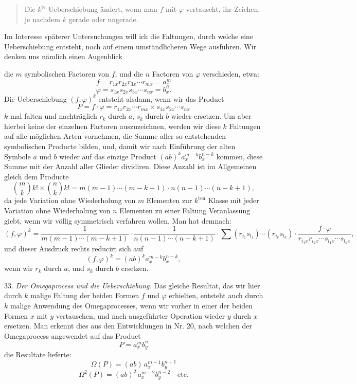 \documentclass[11pt]{article}
\providecommand{\weberpage}[1]{}
\let\Omega\varOmega
\begin{document}
\begin{quote}
\glqq Die $k^{\text{te}}$ Ueberschiebung ändert, wenn man $f$ mit $\varphi$
vertauscht, ihr Zeichen, je nachdem $k$ gerade oder ungerade.\grqq{}
\end{quote}

Im Interesse späterer Untersuchungen will ich die Faltungen, durch welche
eine Ueberschiebung entsteht, noch auf einem umständlicheren Wege
ausführen. Wir denken uns nämlich einen Augenblick


\weberpage{34}

die $m$ symbolischen Factoren von $f$, und die $n$ Factoren von $\varphi$
verschieden, etwa:
\[
f = r_{1x} r_{2x} r_{3x} \cdots r_{mx} = a_x^m
\]
\[
\varphi = s_{1x} s_{2x} s_{3x} \cdots s_{nx} = b_x^n.
\]
Die Ueberschiebung $(f, \varphi)^k$ entsteht alsdann, wenn wir das Product
\[
P = f \cdot \varphi = r_{1x} r_{2x} \cdots r_{mx} \times s_{1x} s_{2x} \cdots s_{nx}
\]
$k$ mal falten und nachträglich $r_k$ durch $a$, $s_k$ durch $b$ wieder
ersetzen. Um aber hierbei keine der einzelnen Factoren auszuzeichnen, werden
wir diese $k$ Faltungen auf alle möglichen Arten vornehmen, die Summe aller
so entstehenden symbolischen Producte bilden, und, damit wir nach
Einführung der alten Symbole $a$ und $b$ wieder auf das einzige Product
$(ab)^k a_x^{m-k} b_x^{n-k}$ kommen, diese Summe mit der Anzahl aller
Glieder dividiren. Diese Anzahl ist im Allgemeinen gleich dem Producte
\[
\binom{m}{k} k! \times \binom{n}{k} k! = m(m-1) \cdots (m-k+1) \cdot n(n-1) \cdots (n-k+1),
\]
da jede Variation ohne Wiederholung von $m$ Elementen zur $k^{\text{ten}}$
Klasse mit jeder Variation ohne Wiederholung von $n$ Elementen zu einer
Faltung Veranlassung giebt, wenn wir völlig symmetrisch verfahren wollen.
Man hat demnach:
\[
(f, \varphi)^k = \frac{1}{m(m-1) \cdots (m-k+1)} \cdot \frac{1}{n(n-1) \cdots (n-k+1)}
\cdot \sum (r_{i_1} s_{l_1}) \cdots (r_{i_k} s_{l_k}) \cdot \frac{f \cdot \varphi}{r_{i_1 x} r_{i_2 x} \cdots s_{l_1 x} \cdots s_{l_k x}},
\]
und dieser Ausdruck rechts reducirt sich auf
\[
(f, \varphi)^k = (ab)^k a_x^{m-k} b_x^{n-k},
\]
wenn wir $r_k$ durch $a$, und $s_k$ durch $b$ ersetzen.

33. \textit{Der Omegaprocess und die Ueberschiebung.} Das gleiche
Resultat, das wir hier durch $k$ malige Faltung der beiden Formen $f$ und
$\varphi$ erhielten, entsteht auch durch $k$ malige Anwendung des
Omegaprocesses, wenn wir vorher in einer der beiden Formen $x$ mit $y$
vertauschen, und nach ausgeführter Operation wieder $y$ durch $x$
ersetzen. Man erkennt dies aus den Entwicklungen in Nr. 20, nach welchen
der Omegaprocess angewendet auf das Product
\[
P = a_x^m b_y^n
\]
die Resultate lieferte:
\[
\Omega(P) = (ab)\, a_x^{m-1} b_y^{n-1}
\]
\[
\Omega^2(P) = (ab)^2\, a_x^{m-2} b_y^{n-2} \quad \text{etc.}
\]
\end{document}
